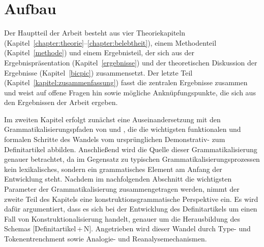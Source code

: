 



\section{Aufbau} 

Der Hauptteil der Arbeit besteht aus vier Theoriekapiteln  (Kapitel~\ref{chapter:theorie}--\ref{chapter:belebtheit}), einem Methodenteil (Kapitel~\ref{methode}) und einem Ergebnisteil, der sich aus der Ergebnispräsentation (Kapitel~\ref{ergebnisse}) und der theoretischen Diskussion der Ergebnisse (Kapitel~\ref{bicpic}) zusammensetzt. Der letzte Teil (Kapitel~\ref{kapitel:zusammenfassung}) fasst die zentralen Ergebnisse zusammen und weist auf offene Fragen hin sowie mögliche Anknüpfungspunkte, die sich aus den Ergebnissen der Arbeit ergeben. 

Im zweiten Kapitel erfolgt zunächst eine Auseinandersetzung mit den Grammatikalisierungspfaden von \textcite{Greenberg1978} und \textcite{Lehmann2015}, die die wichtigsten funktionalen und formalen Schritte des Wandels vom ursprünglichen Demonstrativ- zum Definitartikel abbilden. Anschließend wird die Quelle dieser Grammatikalisierung genauer betrachtet, da im Gegensatz zu typischen Grammatikalisierungsprozessen kein lexikalisches, sondern ein grammatisches Element am Anfang der Entwicklung steht. Nachdem im nachfolgenden Abschnitt die wichtigsten Parameter der Grammatikalisierung zusammengetragen werden, nimmt der zweite Teil des Kapitels eine konstruktionsgrammatische Perspektive ein. Es wird dafür argumentiert, dass es sich bei der Entwicklung des Definitartikels um einen Fall von Konstruktionalisierung handelt, genauer um die Herausbildung des Schemas [Definitartikel\,+\,N]. Angetrieben wird dieser Wandel durch Type- und Tokenentrenchment sowie Analogie- und Reanalysemechanismen. 

